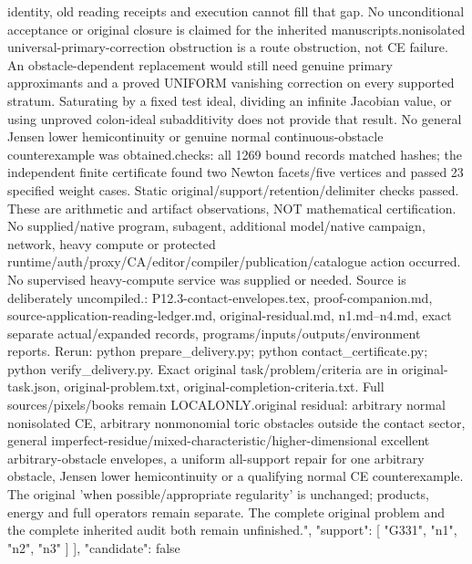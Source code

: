 \documentclass[11pt]{article}
\begin{document}
\begin{ActualFinalDATA}
{{identity, old reading receipts and execution cannot fill that gap. No unconditional acceptance or original closure is claimed for the inherited manuscripts.\n\nThe nonisolated universal-primary-correction obstruction is a route obstruction, not CE failure. An obstacle-dependent replacement would still need genuine primary approximants and a proved UNIFORM vanishing correction on every supported stratum. Saturating by a fixed test ideal, dividing an infinite Jacobian value, or using unproved colon-ideal subadditivity does not provide that result. No general Jensen lower hemicontinuity or genuine normal continuous-obstacle counterexample was obtained.\n\nObserved checks: all 1269 bound records matched hashes; the independent finite certificate found two Newton facets/five vertices and passed 23 specified weight cases. Static original/support/retention/delimiter checks passed. These are arithmetic and artifact observations, NOT mathematical certification. No supplied/native program, subagent, additional model/native campaign, network, heavy compute or protected runtime/auth/proxy/CA/editor/compiler/publication/catalogue action occurred. No supervised heavy-compute service was supplied or needed. Source is deliberately uncompiled.\n\nDeliverables: P12.3-contact-envelopes.tex, proof-companion.md, source-application-reading-ledger.md, original-residual.md, n1.md--n4.md, exact separate actual/expanded records, programs/inputs/outputs/environment reports. Rerun: python prepare_delivery.py; python contact_certificate.py; python verify_delivery.py. Exact original task/problem/criteria are in original-task.json, original-problem.txt, original-completion-criteria.txt. Full sources/pixels/books remain LOCALONLY.\n\nRemaining original residual: arbitrary normal nonisolated CE, arbitrary nonmonomial toric obstacles outside the contact sector, general imperfect-residue/mixed-characteristic/higher-dimensional excellent arbitrary-obstacle envelopes, a uniform all-support repair for one arbitrary obstacle, Jensen lower hemicontinuity or a qualifying normal CE counterexample. The original 'when possible/appropriate regularity' is unchanged; products, energy and full operators remain separate. The complete original problem and the complete inherited audit both remain unfinished.\n",
      "support": [
        "G331",
        "n1",
        "n2",
        "n3"
      ]
    }
  ],
  "candidate": false
}
\end{ActualFinalDATA}
\end{document}
